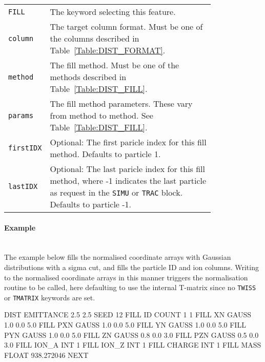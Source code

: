 \begin{tabular}{@{}lp{0.8\linewidth}}
    \texttt{FILL}     & The keyword selecting this feature. \\
    \texttt{column}   & The target column format. Must be one of the columns described in Table~\ref{Table:DIST_FORMAT}. \\
    \texttt{method}   & The fill method. Must be one of the methods described in Table~\ref{Table:DIST_FILL}. \\
    \texttt{params}   & The fill method parameters. These vary from method to method. See Table~\ref{Table:DIST_FILL}. \\
    \texttt{firstIDX} & Optional: The first paricle index for this fill method. Defaults to particle 1. \\
    \texttt{lastIDX}  & Optional: The last paricle index for this fill method, where -1 indicates the last particle as request in the \texttt{SIMU} or \texttt{TRAC} block. Defaults to particle -1.
\end{tabular}

\paragraph{Example}~\\

The example below fills the normalised coordinate arrays with Gaussian distributions with a sigma cut, and fills the particle ID and ion columns.
Writing to the normalised coordinate arrays in this manner triggers the normalisation routine to be called, here defaulting to use the internal T-matrix since no \texttt{TWISS} or \texttt{TMATRIX} keywords are set.

\begin{cverbatim}
DIST
  EMITTANCE 2.5 2.5
  SEED 12
  FILL ID     COUNT  1   1
  FILL XN     GAUSS  1.0 0.0 5.0
  FILL PXN    GAUSS  1.0 0.0 5.0
  FILL YN     GAUSS  1.0 0.0 5.0
  FILL PYN    GAUSS  1.0 0.0 5.0
  FILL ZN     GAUSS  0.8 0.0 3.0
  FILL PZN    GAUSS  0.5 0.0 3.0
  FILL ION_A  INT    1
  FILL ION_Z  INT    1
  FILL CHARGE INT    1
  FILL MASS   FLOAT  938.272046
NEXT
\end{cverbatim}

